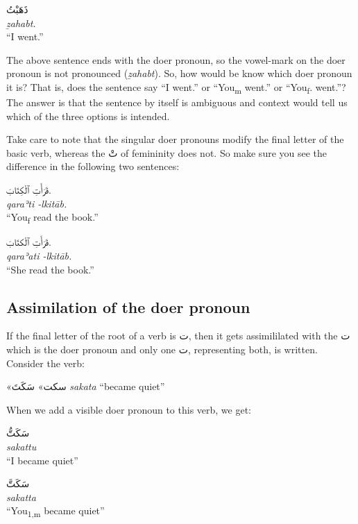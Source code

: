 \documentclass[
  10pt,
]{book}
\begin{document}
\foreignlanguage{arabic}{ذَهَبْتُ}\\
\emph{ẕahabt.}\\
\enquote{I went.}

The above sentence ends with the doer pronoun, so the vowel-mark on the doer pronoun is not pronounced (\emph{ẕahabt}). So, how would be know which doer pronoun it is? That is, does the sentence say \enquote{I went.} or \enquote{You\textsubscript{m} went.} or \enquote{You\textsubscript{f}. went.}? The answer is that the sentence by itself is ambiguous and context would tell us which of the three options is intended.

Take care to note that the singular doer pronouns modify the final letter of the basic verb, whereas the \foreignlanguage{arabic}{تْ} of femininity does not. So make sure you see the difference in the following two sentences:

\foreignlanguage{arabic}{قَرَأْتِ ٱلْکِتَابَ.}\\
\emph{qaraʾti -lkitāb.}\\
\enquote{You\textsubscript{f} read the book.}

\foreignlanguage{arabic}{قَرَأَتِ ٱلْکتَابَ.}\\
\emph{qaraʾati -lkitāb.}\\
\enquote{She read the book.}

\subsection{Assimilation of the doer pronoun}\label{assimilation-of-the-doer-pronoun}

If the final letter of the root of a verb is \foreignlanguage{arabic}{ت}, then it gets assimililated with the \foreignlanguage{arabic}{ت} which is the doer pronoun and only one \foreignlanguage{arabic}{ت}, representing both, is written. Consider the verb:

\foreignlanguage{arabic}{«سکت»} \foreignlanguage{arabic}{سَکَتَ} \emph{sakata} \enquote{became quiet}

When we add a visible doer pronoun to this verb, we get:

\foreignlanguage{arabic}{سَکَتُّ}\\
\emph{sakattu}\\
\enquote{I became quiet}

\foreignlanguage{arabic}{سَکَتَّ}\\
\emph{sakatta}\\
\enquote{You\textsubscript{1,m} became quiet}
\end{document}

